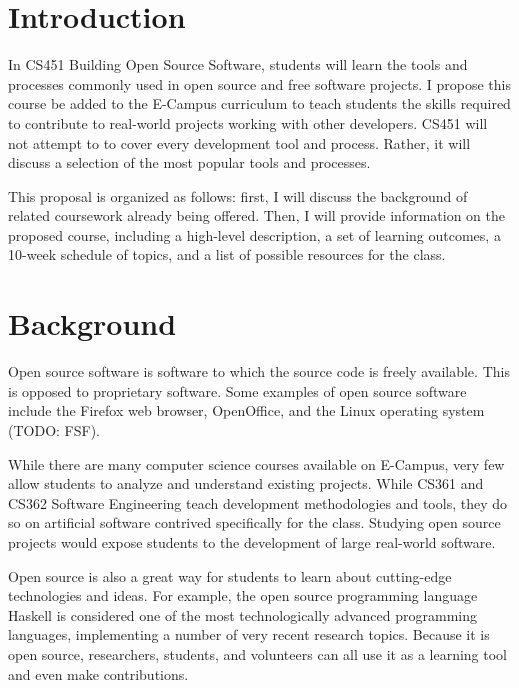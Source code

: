 \documentclass[12pt,letterpaper]{article}
\begin{document}
\pagebreak

\tableofcontents

\cleardoublepage
{}
\listoftables

\pagebreak

\section{Introduction}
In CS451 Building Open Source Software, students will learn the tools and
processes commonly used in open source and free software projects.  I propose
this course be added to the E-Campus curriculum to teach students the skills
required to contribute to real-world projects working with other developers.
CS451 will not attempt to to cover every development tool and process.  Rather,
it will discuss a selection of the most popular tools and processes.

This proposal is organized as follows: first, I will discuss the background of
related coursework already being offered.  Then, I will provide information on
the proposed course, including a high-level description, a set of learning
outcomes, a 10-week schedule of topics, and a list of possible resources for the
class.

\section{Background}
Open source software is software to which the source code is freely available.
This is opposed to proprietary software.  Some examples of open source software
include the Firefox web browser, OpenOffice, and the Linux operating system
(TODO: FSF).

While there are many computer science courses available on E-Campus, very few
allow students to analyze and understand existing projects.  While CS361 and
CS362 Software Engineering teach development methodologies and tools, they do so
on artificial software contrived specifically for the class.  Studying open
source projects would expose students to the development of large real-world
software.

Open source is also a great way for students to learn about cutting-edge
technologies and ideas.  For example, the open source programming language
Haskell is considered one of the most technologically advanced programming
languages, implementing a number of very recent research topics.  Because it is
open source, researchers, students, and volunteers can all use it as a learning
tool and even make contributions.
\end{document}
